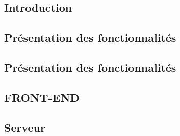 

\subsection{Introduction}


\subsection{Présentation des fonctionnalités}


\subsection{Présentation des fonctionnalités}




\subsection{FRONT-END}


\subsection{Serveur}


%

%
